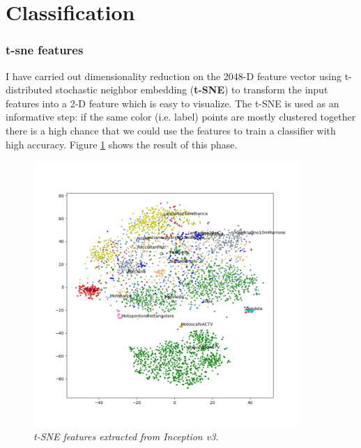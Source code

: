 \documentclass[12pt]{article}
\begin{document}
\section{Classification}
\subsubsection{t-sne features}
I have carried out dimensionality reduction on the 2048-D feature vector using t-distributed stochastic neighbor embedding (\textbf{t-SNE}) to transform the input features into a 2-D feature which is easy to visualize. The t-SNE is used as an informative step: if the same color (i.e. label) points are mostly clustered together there is a high chance that we could use the features to train a classifier with high accuracy. Figure \ref{fig:tsne} shows the result of this phase.

\begin{figure}[!hb]
	\centering %
	\includegraphics[width=0.9\textwidth]{../code/output/features.png} %
	\caption{\textit{t-SNE features extracted from Inception v3.}} %
	\label{fig:tsne}
\end{figure}
\end{document}
